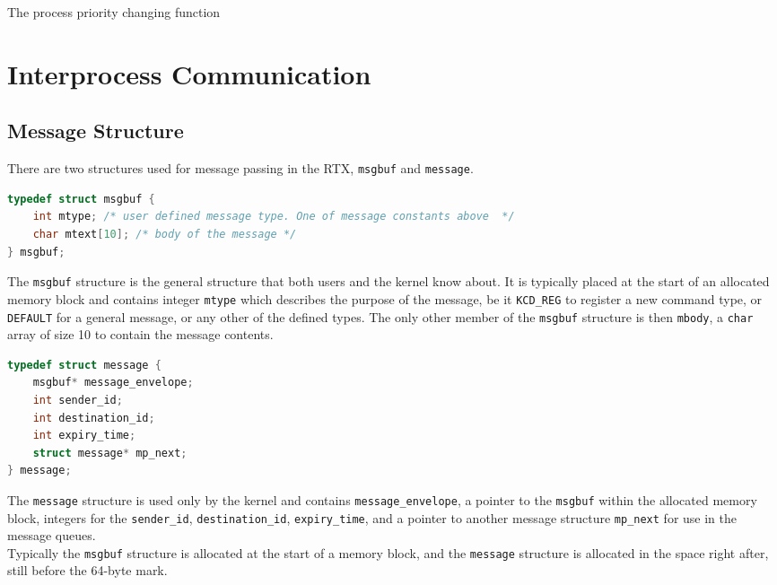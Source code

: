 \documentclass[12pt]{report}
\begin{document}
\begin{algorithm}
  \caption{The process priority changing function}
  \begin{algorithmic}[1]
		\EndIf
    \EndProcedure
  \end{algorithmic}
\end{algorithm}

\pagebreak


\section{Interprocess Communication}

\subsection{Message Structure}

There are two structures used for message passing in the RTX, \texttt{msgbuf} and
\texttt{message}. \\
\begin{lstlisting}[language=C, frame=single]
typedef struct msgbuf {
	int mtype; /* user defined message type. One of message constants above  */
	char mtext[10]; /* body of the message */
} msgbuf;
\end{lstlisting}
The \texttt{msgbuf} structure is the general structure that both users and the
kernel know about. It is typically placed at the start of an allocated memory block
and contains integer \texttt{mtype} which describes the purpose of the message, be it
\texttt{KCD_REG} to register a new command type, or \texttt{DEFAULT} for a general
message, or any other of the defined types. The only other member of the \texttt{msgbuf}
structure is then \texttt{mbody}, a \texttt{char} array of size 10 to contain the 
message contents. \\
\begin{lstlisting}[language=C, frame=single]
typedef struct message {
	msgbuf* message_envelope;
	int sender_id;
	int destination_id;
	int expiry_time;
	struct message* mp_next;
} message;
\end{lstlisting}
The \texttt{message} structure is used only by the kernel and contains \texttt{message_envelope},
a pointer to the \texttt{msgbuf} within the allocated memory block, integers for the
\texttt{sender_id}, \texttt{destination_id}, \texttt{expiry_time}, and a pointer 
to another message structure \texttt{mp_next} for use in the message queues. \\
Typically the \texttt{msgbuf} structure is allocated at the start of a memory block,
and the \texttt{message} structure is allocated in the space right after, still before
the 64-byte mark.
\end{document}
